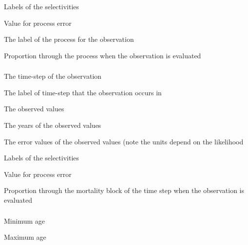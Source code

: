  {Labels of the selectivities}

 {Value for process error}

 {The label of the process for the observation}

 {Proportion through the process when the observation is evaluated}

\subsubsection[Biomass]{}

 {The time-step of the observation}

 {The label of time-step that the observation occurs in}

 {The observed values}

 {The years of the observed values}

 {The error values of the observed values (note the units depend on the likelihood}

 {Labels of the selectivities}

 {Value for process error}

 {Proportion through the mortality block of the time step when the observation is evaluated}

\subsubsection[Process Removals By Age]{}

 {Minimum age}

 {Maximum age}

